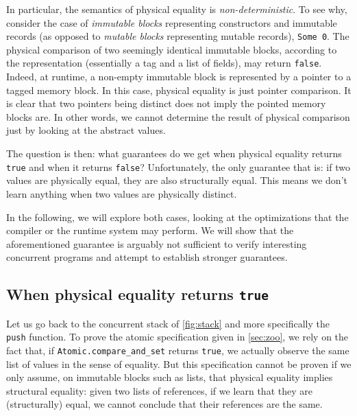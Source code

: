 In particular, the semantics of physical equality is \emph{non-deterministic}.
To see why, consider the case of \emph{immutable blocks} representing constructors and immutable records (as opposed to \emph{mutable blocks} representing mutable records), \eg \texttt{Some 0}.
The physical comparison of two seemingly identical immutable blocks, according to the \Rocq representation (essentially a tag and a list of fields), may return \texttt{false}.
Indeed, at runtime, a non-empty immutable block is represented by a pointer to a tagged memory block.
In this case, physical equality is just pointer comparison.
It is clear that two pointers being distinct does not imply the pointed memory blocks are.
In other words, we cannot determine the result of physical comparison just by looking at the abstract values.

The question is then: what guarantees do we get when physical equality returns \texttt{true} and when it returns \texttt{false}?
Unfortunately, the only guarantee that \OCaml {} is: if two values are physically equal, they are also structurally equal.
This means we don't learn anything when two values are physically distinct.

In the following, we will explore both cases, looking at the optimizations that the compiler or the runtime system may perform.
We will show that the aforementioned guarantee is arguably not sufficient to verify interesting concurrent programs and attempt to establish stronger guarantees.

\subsection{When physical equality returns \texttt{true}}

Let us go back to the concurrent stack of \cref{fig:stack} and more specifically the \texttt{push} function.
To prove the atomic specification given in \cref{sec:zoo}, we rely on the fact that, if \texttt{Atomic.compare_and_set} returns \texttt{true}, we actually observe the same list of values in the sense of \Rocq equality.
But this specification cannot be proven if we only assume, on immutable blocks such as lists, that physical equality implies structural equality: given two lists of references, if we learn that they are (structurally) equal, we cannot conclude that their references are the same.

